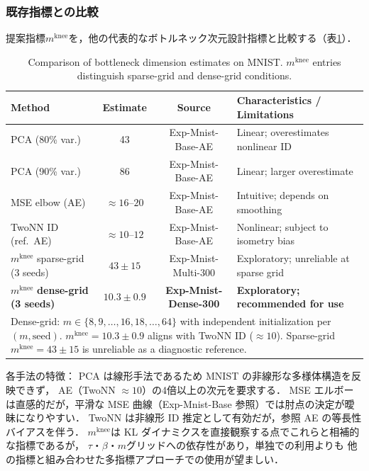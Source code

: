 \documentclass[11pt,a4paper]{jsarticle}
\newcommand{\mknee}{m^{\mathrm{knee}}}
\begin{document}
\subsubsection{既存指標との比較}\label{sec:exp_comparison}

提案指標$\mknee$を，他の代表的なボトルネック次元設計指標と比較する（表\ref{tab:method_comparison}）．

\begin{table}[H]
\centering
\caption{Comparison of bottleneck dimension estimates on MNIST. $\mknee$ entries distinguish sparse-grid and dense-grid conditions.}
\label{tab:method_comparison}
\small
\begin{tabular}{p{4.0cm}cc p{4.5cm}}
\toprule
Method & Estimate & Source & Characteristics / Limitations \\
\midrule
PCA (80\% var.) & 43 & Exp-Mnist-Base-AE & Linear; overestimates nonlinear ID \\
PCA (90\% var.) & 86 & Exp-Mnist-Base-AE & Linear; larger overestimate \\
MSE elbow (AE) & $\approx16$--$20$ & Exp-Mnist-Base-AE & Intuitive; depends on smoothing \\
TwoNN ID (ref.\ AE) & $\approx10$--$12$ & Exp-Mnist-Base-AE & Nonlinear; subject to isometry bias \\
\midrule
$\mknee$ sparse-grid (3 seeds) & $43\pm15$ & Exp-Mnist-Multi-300 & Exploratory; unreliable at sparse grid \\
$\mknee$ \textbf{dense-grid (3 seeds)} & $\boldsymbol{10.3\pm0.9}$ & \textbf{Exp-Mnist-Dense-300} & \textbf{Exploratory; recommended for use} \\
\midrule
\multicolumn{4}{p{13.5cm}}{\footnotesize Dense-grid: $m\in\{8,9,\ldots,16,18,\ldots,64\}$ with independent initialization per $(m,\mathrm{seed})$. $\mknee=10.3\pm0.9$ aligns with TwoNN ID ($\approx10$). Sparse-grid $\mknee=43\pm15$ is unreliable as a diagnostic reference.} \\
\bottomrule
\end{tabular}
\end{table}

各手法の特徴：
PCA は線形手法であるため MNIST の非線形な多様体構造を反映できず，
AE（TwoNN $\approx 10$）の4倍以上の次元を要求する．
MSE エルボーは直感的だが，平滑な MSE 曲線（Exp-Mnist-Base 参照）では肘点の決定が曖昧になりやすい．
TwoNN は非線形 ID 推定として有効だが，参照 AE の等長性バイアスを伴う．
$\mknee$は KL ダイナミクスを直接観察する点でこれらと相補的な指標であるが，
$\tau$・$\beta$・$m$グリッドへの依存性があり，単独での利用よりも
他の指標と組み合わせた多指標アプローチでの使用が望ましい．
\end{document}
